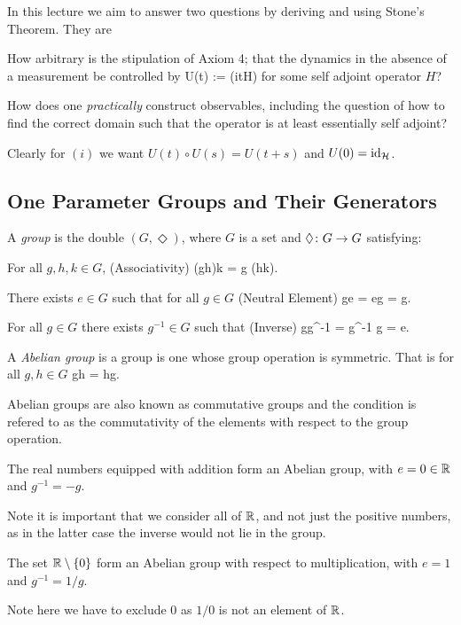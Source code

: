 In this lecture we aim to answer two questions by deriving and using Stone's Theorem. They are 
\ben[label=(\roman*)]
\item How arbitrary is the stipulation of Axiom 4; that the dynamics in the absence of a measurement be controlled by 
\bse 
U(t) := \exp(itH)
\ese 
for some self adjoint operator $H$? 
\item How does one \emph{practically} construct observables, including the question of how to find the correct domain such that the operator is at least essentially self adjoint? 
\een 

\br 
Clearly for $(i)$ we want $U(t)\circ U(s) = U(t+s)$ and $U(0) = \operatorname{id}_{\mathcal{H}}$.
\er 

\subsection{One Parameter Groups and Their Generators}

\bd 
A \emph{group} is the double $(G,\Diamond)$, where $G$ is a set and $\Diamond\colon G \to G$ satisfying:  
\ben[label=(\roman*)]
\item For all $g,h,k\in G$, \hfill (Associativity) 
\bse 
(g\Diamond h)\Diamond k = g \Diamond (h\Diamond k).
\ese 
\item There exists $e\in G$ such that for all $g\in G$ \hfill (Neutral Element) 
\bse 
g\Diamond e = e\Diamond g = g.
\ese 
\item For all $g\in G$ there exists $g^{-1}\in G$ such that \hfill (Inverse) 
\bse 
g\Diamond g^{-1} = g^{-1} \Diamond g = e.
\ese 
\een 
\ed 

\bd 
A \emph{Abelian group} is a group is one whose group operation is symmetric. That is for all $g,h\in G$
\bse 
g\Diamond h = h\Diamond g.
\ese 
\ed 

\br
Abelian groups are also known as commutative groups and the condition is refered to as the commutativity of the elements with respect to the group operation. 
\er 

\be 
The real numbers equipped with addition form an Abelian group, with $e=0\in\mathbb{R}$ and $g^{-1} = -g$. 

Note it is important that we consider all of $\mathbb{R}$, and not just the positive numbers, as in the latter case the inverse would not lie in the group. 
\ee

\be 
The set $\mathbb{R}\setminus\{0\}$ form an Abelian group with respect to multiplication, with $e=1$ and $g^{-1}= 1/g$. 

Note here we have to exclude $0$ as $1/0$ is not an element of $\mathbb{R}$.
\ee


